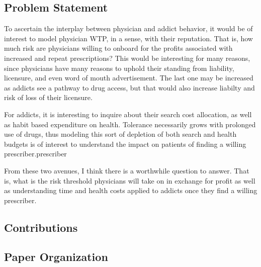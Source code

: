 \documentclass[11pt,a4paper]{article}
\begin{document}

\subsection{Problem Statement}
\label{subsec:problem}

To ascertain the interplay between physician and addict behavior, it would be of interest to model physician WTP, in a sense, with their reputation. That is, how much risk are physicians willing to onboard
for the profits associated with increased and repeat prescriptions? This would be interesting for many reasons, since physicians have many reasons to uphold their standing from liability, licensure, and even
word of mouth advertisement. The last one may be increased as addicts see a pathway to drug access, but that would also increase liabilty and risk of loss of their licensure.

For addicts, it is interesting to inquire about their search cost allocation, as well as habit based expenditure on health. Tolerance necessarily grows with prolonged use of drugs, thus modeling this sort
of depletion of both search and health budgets is of interest to understand the impact on patients of finding a willing prescriber.prescriber

From these two avenues, I think there is a worthwhile question to answer. That is, what is the risk threshold physicians will take on in exchange for profit as well as understanding time and health costs applied
to addicts once they find a willing prescriber.


\subsection{Contributions}
\label{subsec:contributions}


\subsection{Paper Organization}
\label{subsec:organization}
\end{document}
